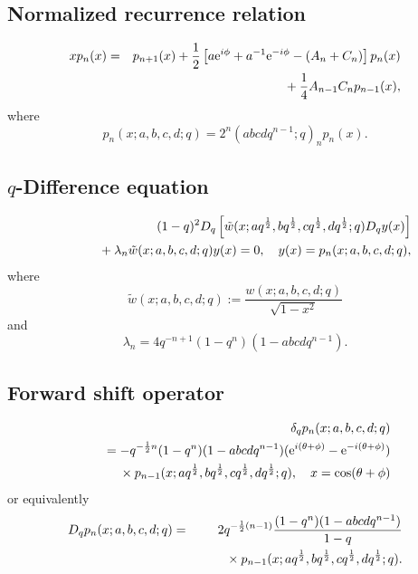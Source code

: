 \documentclass[envcountchap,graybox]{svmono}
\newcommand{\mathindent}{\hspace{7.5mm}}
\newcommand{\e}{\textrm{e}}
\begin{document}
\newpage

\subsection*{Normalized recurrence relation}
\begin{eqnarray}
\label{NormRecContqHahn}
xp_n(x)&=&p_{n+1}(x)+\frac{1}{2}\left[a\e^{i\phi}+a^{-1}\e^{-i\phi}-(A_n+C_n)\right]p_n(x)\nonumber\\
& &{}\mathindent{}+\frac{1}{4}A_{n-1}C_np_{n-1}(x),
\end{eqnarray}
where
$$p_n(x;a,b,c,d;q)=2^n(abcdq^{n-1};q)_np_n(x).$$

\subsection*{$q$-Difference equation}
\begin{eqnarray}
\label{dvContqHahn}
& &(1-q)^2D_q\left[{\tilde w}(x;aq^{\frac{1}{2}},bq^{\frac{1}{2}},
cq^{\frac{1}{2}},dq^{\frac{1}{2}};q)D_qy(x)\right]\nonumber\\
& &{}\mathindent{}+\lambda_n{\tilde w}(x;a,b,c,d;q)y(x)=0,
\quad y(x)=p_n(x;a,b,c,d;q),
\end{eqnarray}
where
$${\tilde w}(x;a,b,c,d;q):=\frac{w(x;a,b,c,d;q)}{\sqrt{1-x^2}}$$
and
$$\lambda_n=4q^{-n+1}(1-q^n)(1-abcdq^{n-1}).$$

\subsection*{Forward shift operator}
\begin{eqnarray}
\label{shift1ContqHahnI}
& &\delta_q p_n(x;a,b,c,d;q)\nonumber\\
& &{}=-q^{-\frac{1}{2}n}(1-q^n)(1-abcdq^{n-1})(\e^{i(\theta+\phi)}-\e^{-i(\theta+\phi)})\nonumber\\
& &{}\mathindent{}\times p_{n-1}(x;aq^{\frac{1}{2}},bq^{\frac{1}{2}},cq^{\frac{1}{2}},dq^{\frac{1}{2}};q),
\quad x=\cos(\theta+\phi)
\end{eqnarray}
or equivalently
\begin{eqnarray}
\label{shift1ContqHahnII}
D_q p_n(x;a,b,c,d;q)&=&2q^{-\frac{1}{2}(n-1)}\frac{(1-q^n)(1-abcdq^{n-1})}{1-q}\nonumber\\
& &{}\mathindent{}\times p_{n-1}(x;aq^{\frac{1}{2}},bq^{\frac{1}{2}},cq^{\frac{1}{2}},dq^{\frac{1}{2}};q).
\end{eqnarray}

\newpage
\end{document}
